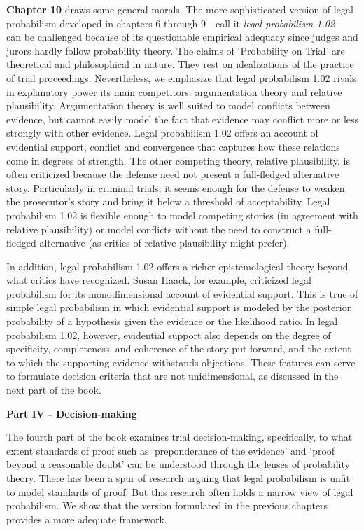 \documentclass[
  10pt,
  dvipsnames,enabledeprecatedfontcommands]{scrartcl}
\begin{document}
\textbf{Chapter 10} draws some general morals. The more sophisticated
version of legal probabilism developed in chapters 6 through 9---call it
\textit{legal probabilism 1.02}---can be challenged because of its
questionable empirical adequacy since judges and jurors hardly follow
probability theory. The claims of `Probability on Trial' are theoretical
and philosophical in nature. They rest on idealizations of the practice
of trial proceedings. Nevertheless, we emphasize that legal probabilism
1.02 rivals in explanatory power its main competitors: argumentation
theory and relative plausibility. Argumentation theory is well suited to
model conflicts between evidence, but cannot easily model the fact that
evidence may conflict more or less strongly with other evidence. Legal
probabilism 1.02 offers an account of evidential support, conflict and
convergence that captures how these relations come in degrees of
strength. The other competing theory, relative plausibility, is often
criticized because the defense need not present a full-fledged
alternative story. Particularly in criminal trials, it seems enough for
the defense to weaken the prosecutor's story and bring it below a
threshold of acceptability. Legal probabilism 1.02 is flexible enough to
model competing stories (in agreement with relative plausibility) or
model conflicts without the need to construct a full-fledged alternative
(as critics of relative plausibility might prefer).

In addition, legal probabilism 1.02 offers a richer epistemological
theory beyond what critics have recognized. Susan Haack, for example,
criticized legal probabilism for its monodimensional account of
evidential support. This is true of simple legal probabilism in which
evidential support is modeled by the posterior probability of a
hypothesis given the evidence or the likelihood ratio. In legal
probabilism 1.02, however, evidential support also depends on the degree
of specificity, completeness, and coherence of the story put forward,
and the extent to which the supporting evidence withstands objections.
These features can serve to formulate decision criteria that are not
unidimensional, as discussed in the next part of the book.

\vspace{3mm}

\noindent \textbf{Part IV - Decision-making}

\noindent The fourth part of the book examines trial decision-making,
specifically, to what extent standards of proof such as `preponderance
of the evidence' and `proof beyond a reasonable doubt' can be understood
through the lenses of probability theory. There has been a spur of
research arguing that legal probabilism is unfit to model standards of
proof. But this research often holds a narrow view of legal probabilism.
We show that the version formulated in the previous chapters provides a
more adequate framework.
\end{document}
